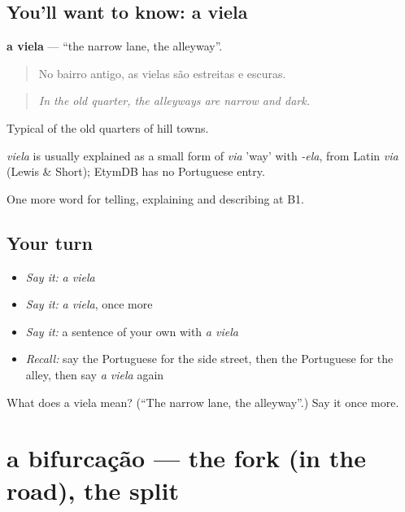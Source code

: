 \subsection*{You'll want to know: a viela}
\textbf{a viela} — \textquotedblleft{}the narrow lane, the alleyway\textquotedblright{}.

\begin{quote}
No bairro antigo, as vielas são estreitas e escuras.
\end{quote}

\begin{quote}
\emph{In the old quarter, the alleyways are narrow and dark.}
\end{quote}

Typical of the old quarters of hill towns.

\begin{cousinweb}
\emph{viela} is usually explained as a small form of \emph{via} 'way' with \emph{-ela}, from Latin \emph{via} (Lewis \& Short); EtymDB has no Portuguese entry.
\end{cousinweb}

\begin{grammarlens}[title={What you've built}]
One more word for telling, explaining and describing at B1.
\end{grammarlens}

\subsection*{Your turn}
\begin{itemize}
\raggedright
  \item \emph{Say it:} \emph{a viela}
  \item \emph{Say it:} \emph{a viela}, once more
  \item \emph{Say it:} a sentence of your own with \emph{a viela}
  \item \emph{Recall:} say the Portuguese for the side street, then the Portuguese for the alley, then say \emph{a viela} again
\end{itemize}

\begin{tcolorbox}[breakable,colback=teal!4,colframe=teal!35!black,title={Before you move on}]
What does a viela mean? (\textquotedblleft{}The narrow lane, the alleyway\textquotedblright{}.) Say it once more.
\end{tcolorbox}
\section[a bifurcação]{a bifurcação — the fork (in the road), the split}

